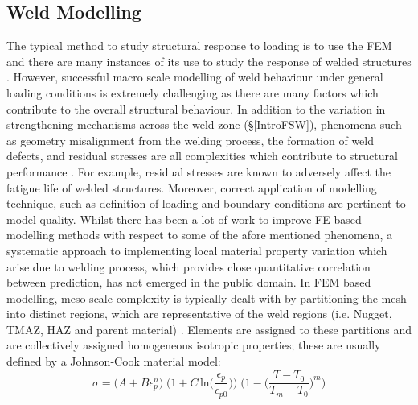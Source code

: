 \subsection{Weld Modelling}
\label{IntroWeldeModelling}
The typical method to study structural response to loading is to use the FEM and there are many instances of its use to study the response of welded structures \cite{Grujicic2011,McWilliams2013,Reis2004,Zhao2001}. However, successful macro scale modelling of weld behaviour under general loading conditions is extremely challenging as there are many factors which contribute to the overall structural behaviour. In addition to the variation in strengthening mechanisms across the weld zone (\S\ref{IntroFSW}), phenomena such as geometry misalignment from the welding process, the formation of weld defects, and residual stresses are all complexities which contribute to structural performance \cite{Kim2010,Grujicic2011a}. For example, residual stresses are known to adversely affect the fatigue life of welded structures. Moreover, correct application of modelling technique, such as definition of loading and boundary conditions are pertinent to model quality.  Whilst there has been a lot of work to improve FE based modelling methods with respect to some of the afore mentioned phenomena, a systematic approach to implementing local material property variation which arise due to welding process, which provides close quantitative correlation between prediction, has not emerged in the public domain. 
In FEM based modelling, meso-scale complexity is typically dealt with by partitioning the mesh into distinct regions, which are representative of the weld regions (i.e. Nugget, TMAZ, HAZ and parent material) \cite{McWilliams2013,Grujicic2011}. Elements are assigned to these partitions and are collectively assigned homogeneous isotropic properties; these are usually defined by a Johnson-Cook material model:
\begin{equation}
\label{eq1}
\sigma = \bigg( A + B\epsilon^n_{p} \bigg)\; \bigg(1 +C\,\text{ln}\bigg(\frac{\dot{\epsilon}_{p}}{\dot{\epsilon}_{p0}}\bigg)\bigg)\; \bigg(1-\bigg(\frac{T-T_0}{T_m-T_0}\bigg)^m\bigg)
\end{equation}
